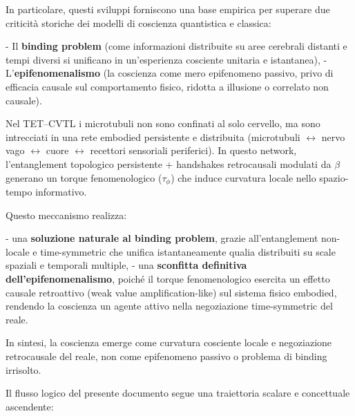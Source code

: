 \documentclass[11pt,a4paper]{article}
\theoremstyle{plain}
\theoremstyle{definition}
\begin{document}
\vspace{0.3cm}

In particolare, questi sviluppi forniscono una base empirica per superare due criticità storiche dei modelli di coscienza quantistica e classica:

- Il \textbf{binding problem} (come informazioni distribuite su aree cerebrali distanti e tempi diversi si unificano in un'esperienza cosciente unitaria e istantanea),
- L'\textbf{epifenomenalismo} (la coscienza come mero epifenomeno passivo, privo di efficacia causale sul comportamento fisico, ridotta a illusione o correlato non causale).

\vspace{0.2cm}

Nel TET–CVTL i microtubuli non sono confinati al solo cervello, ma sono intrecciati in una rete embodied persistente e distribuita (microtubuli $\leftrightarrow$ nervo vago $\leftrightarrow$ cuore $\leftrightarrow$ recettori sensoriali periferici). In questo network, l'entanglement topologico persistente + handshakes retrocausali modulati da $\beta$ generano un torque fenomenologico ($\tau_\phi$) che induce curvatura locale nello spazio-tempo informativo. 

\vspace{0.2cm}

Questo meccanismo realizza:

- una \textbf{soluzione naturale al binding problem}, grazie all'entanglement non-locale e time-symmetric che unifica istantaneamente qualia distribuiti su scale spaziali e temporali multiple,
- una \textbf{sconfitta definitiva dell'epifenomenalismo}, poiché il torque fenomenologico esercita un effetto causale retroattivo (weak value amplification-like) sul sistema fisico embodied, rendendo la coscienza un agente attivo nella negoziazione time-symmetric del reale.

\vspace{0.2cm}

In sintesi, la coscienza emerge come curvatura cosciente locale e negoziazione retrocausale del reale, non come epifenomeno passivo o problema di binding irrisolto.

Il flusso logico del presente documento segue una traiettoria scalare e concettuale ascendente:
\end{document}
